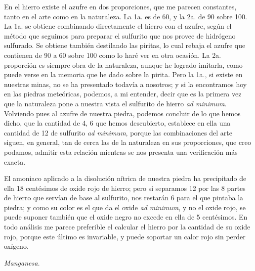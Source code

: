 \documentclass[a4paper, 12pt, oneside, spanish]{article}
\begin{document}
En el hierro existe el azufre en dos proporciones, que me parecen constantes, tanto en el arte como en la naturaleza. La 1a. es de 60, y la 2a. de 90 sobre 100. La 1a. se obtiene combinando directamente el hierro con el azufre, según el método que seguimos para preparar el sulfurito que nos provee de hidrógeno sulfurado. Se obtiene también destilando las piritas, lo cual rebaja el azufre que contienen de 90 a 60 sobre 100 como lo haré ver en otra ocasión. La 2a. proporción es siempre obra de la naturaleza, aunque he logrado imitarla, como puede verse en la memoria que he dado sobre la pirita. Pero la 1a., si existe en nuestras minas, no se ha presentado todavía a nosotros; y si la encontramos hoy en las piedras meteóricas, podemos, a mi entender, decir que es la primera vez que la naturaleza pone a nuestra vista el sulfurito de hierro \emph{ad minimum}. Volviendo pues al azufre de nuestra piedra, podemos concluir de lo que hemos dicho, que la cantidad de 4, 6 que hemos descubierto, establece en ella una cantidad de 12 de sulfurito \emph{ad minimum}, porque las combinaciones del arte siguen, en general, tan de cerca las de la naturaleza en sus proporciones, que creo podamos, admitir esta relación mientras se nos presenta una verificación más exacta.

El amoniaco aplicado a la disolución nítrica de nuestra piedra ha precipitado de ella 18 centésimos de oxide rojo de hierro; pero si separamos 12 por las 8 partes de hierro que servían de base al sulfurito, nos restarán 6 para el que pintaba la piedra; y como su color es el que da el oxide \emph{ad minimum}, y no el oxide rojo, se puede suponer también que el oxide negro no excede en ella de 5 centésimos. En todo análisis me parece preferible el calcular el hierro por la cantidad de su oxide rojo, porque este último es invariable, y puede soportar un calor rojo sin perder oxígeno.
\clearpage
\begin{center}
\emph{Manganesa.}
\end{center}
\end{document}
